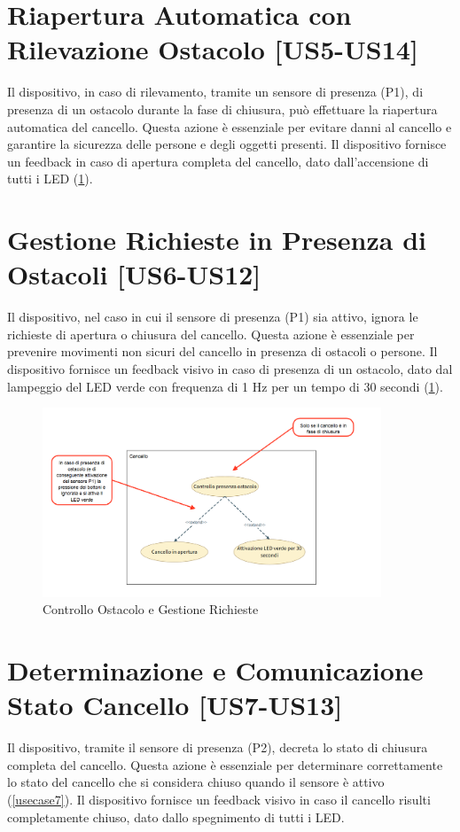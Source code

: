 \section{Riapertura Automatica con Rilevazione Ostacolo [US5-US14]}
Il dispositivo, in caso di rilevamento, tramite un sensore di presenza (P1), di presenza di un ostacolo durante la fase di chiusura, può effettuare la riapertura automatica del cancello. Questa azione è essenziale per evitare danni al cancello e garantire la sicurezza delle persone e degli oggetti presenti. 
Il dispositivo fornisce un feedback in caso di apertura completa del cancello, dato dall'accensione di tutti i LED (\ref{usecase5}).


\section{Gestione Richieste in Presenza di Ostacoli [US6-US12]}
Il dispositivo, nel caso in cui il sensore di presenza (P1) sia attivo, ignora le richieste di apertura o chiusura del cancello.
Questa azione è essenziale per prevenire movimenti non sicuri del cancello in presenza di ostacoli o persone.
Il dispositivo fornisce un feedback visivo in caso di presenza di un ostacolo, dato dal lampeggio del LED verde con frequenza di 1 Hz per un tempo di 30 secondi (\ref{usecase5}).


\begin{figure}[H]
    \centering
    \includegraphics[width=0.9\textwidth]{figures/usecase_5.png}
    \caption{Controllo Ostacolo e Gestione Richieste}
    \label{usecase5}
\end{figure}


\section{Determinazione e Comunicazione Stato Cancello [US7-US13]}
Il dispositivo, tramite il sensore di presenza (P2), decreta lo stato di chiusura completa del cancello.
Questa azione è essenziale per determinare correttamente lo stato del cancello che si considera chiuso quando il sensore è attivo (\ref{usecase7}). 
Il dispositivo fornisce un feedback visivo in caso il cancello risulti completamente chiuso, dato dallo spegnimento di tutti i LED.

